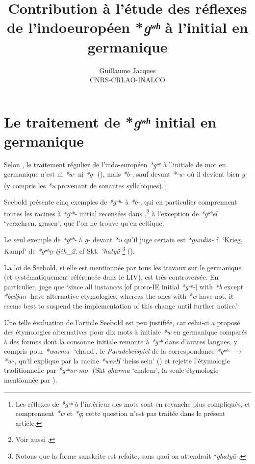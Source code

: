 \documentclass[11pt]{article}
\newcommand{\ipa}[1]{{\phon\textit{#1}}}
\begin{document}
 
\title{Contribution à l'étude des réflexes de l'indoeuropéen *\ipa{gʷʰ} à l'initial en germanique}
\author{Guillaume Jacques\\ CNRS-CRLAO-INALCO}
\maketitle

\sloppy

\section{Le traitement de *\ipa{gʷʰ} initial en germanique}
Selon \citet{seebold67ghw}, le traitement régulier de l'indo-européen \ipa{*gʷʰ} à l'initiale de mot en germanique n'est ni \ipa{*w-} ni \ipa{*g-} (\citealt[122-3]{streitberg1900urgermanische}), mais \ipa{*b-}, sauf devant \ipa{*-u-} où il devient bien \ipa{g-} (y compris les \ipa{*u} provenant de sonantes syllabiques).\footnote{Les réflexes de \ipa{*gʷʰ} à l'intérieur des mots sont en revanche plus compliqués, et comprennent \ipa{*w} et \ipa{*g}; cette question n'est pas traitée dans le présent article. }

Seebold présente cinq exemples de \ipa{*gʷʰ-} à \ipa{*b-}, qui en particulier comprennent toutes les racines à \ipa{*gʷʰ-} initial recensées dans \citet{liv},\footnote{Voir aussi \citet[note 46]{garnier16dybo}.} à l'exception de \ipa{*gʷʰel} `verzehren, grasen', que l'on ne trouve qu'en celtique.

Le seul exemple de \ipa{*gʷʰ-} à \ipa{g-} devant \ipa{*u} qu'il juge certain est \ipa{*gundiō-} f. `Krieg, Kampf' de \ipa{*gʷʰṇ-tjéh_2}, cf Skt. \ipa{°hatyā́-}\footnote{Notons que la forme sanskrite est refaite, sans quoi on attendrait $\dagger$\ipa{ghatyā-}.} (\citealt[105]{seebold67ghw}).

La loi de Seebold, si elle est mentionnée par tous les travaux sur le germanique (et systématiquement référencée dans le LIV), est très controversée. En particulier, \citet[xxviii]{kroonen13dict} juge que `since all instances [of proto-IE initial \ipa{*gʷʰ-}] with \ipa{*b} except \ipa{*bedjan-} have alternative etymologies, whereas the ones with \ipa{*w} have not, it seems best to suspend the implementation of this change until further notice.'

Une telle évaluation de l'article Seebold est peu justifiée, car celui-ci a proposé des étymologies alternatives pour dix mots à initiale \ipa{*w} en germanique comparés à des formes dont la consonne initiale remonte à \ipa{*gʷʰ} dans d'autres langues, y compris pour \ipa{*warma-} `chaud', le \textit{Paradebeispiel} de la correspondance \ipa{*gʷʰ-} $\rightarrow$ \ipa{*w-}, qu'il explique par la racine \ipa{*werH} `heiss sein' (\citealt[689]{liv}) et rejette l'étymologie traditionnelle par \ipa{*gʷʰor-mo-} (Skt \ipa{gharma-}`chaleur', la seule étymologie mentionnée par \citealt[575]{kroonen13dict}).
\end{document}
